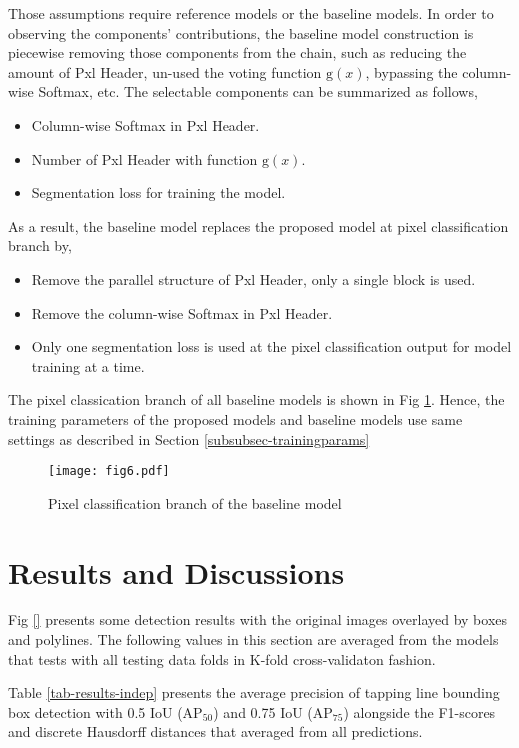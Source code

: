 \documentclass[default,pdflatex,iicol]{sn-jnl}%
\begin{document}
Those assumptions require reference models or the baseline models. In order to observing the components' contributions, the baseline model construction is piecewise removing those components from the chain, such as reducing the amount of Pxl Header, un-used the voting function $\mathrm{g}(x)$, bypassing the column-wise Softmax, etc. The selectable components can be summarized as follows,
\begin{itemize}
  \item Column-wise Softmax in Pxl Header.
  \item Number of Pxl Header with function $\mathrm{g}(x)$.
  \item Segmentation loss for training the model.
\end{itemize}

As a result, the baseline model replaces the proposed model at pixel classification branch by,
\begin{itemize} 
  \item Remove the parallel structure of Pxl Header, only a single block is used.
  \item Remove the column-wise Softmax in Pxl Header.
  \item Only one segmentation loss is used at the pixel classification output for model training at a time.
\end{itemize}
The pixel classication branch of all baseline models is shown in Fig \ref{fig6-baselinePxlHeader}. Hence, the training parameters of the proposed models and baseline models use same settings as described in Section \ref{subsubsec-trainingparams}

\begin{figure}[h]%
\centering
\texttt{[image: fig6.pdf]}
\caption{Pixel classification branch of the baseline model}\label{fig6-baselinePxlHeader}
\end{figure}

\section{Results and Discussions}\label{sec-results}
Fig \ref{} presents some detection results with the original images overlayed by boxes and polylines. The following values in this section are averaged from the models that tests with all testing data folds in K-fold cross-validaton fashion.

Table \ref{tab-results-indep} presents the average precision of tapping line bounding box detection with 0.5 IoU ($\mathrm{AP}_{50}$) and 0.75 IoU ($\mathrm{AP}_{75}$) alongside the F1-scores and discrete Hausdorff distances that averaged from all predictions.
\end{document}
